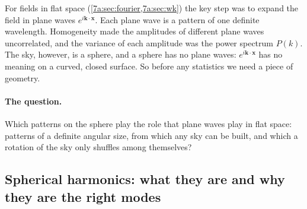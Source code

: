 For fields in flat space (\cref{7a:sec:fourier,7a:sec:wk}) the key step was to expand the
field in plane waves $e^{i\bm k\cdot\bm x}$. Each plane wave is a pattern of one definite
wavelength. Homogeneity made the amplitudes of different plane waves uncorrelated, and the
variance of each amplitude was the power spectrum $P(k)$. The sky, however, is a sphere, and a
sphere has no plane waves: $e^{i\bm k\cdot\bm x}$ has no meaning on a curved, closed surface. So
before any statistics we need a piece of geometry.

\paragraph{The question.} Which patterns on the sphere play the role that plane waves play in
flat space: patterns of a definite angular size, from which any sky can be built, and which a
rotation of the sky only shuffles among themselves?

\subsection{Spherical harmonics: what they are and why they are the right modes}
\label{7b:sec:ylm}

